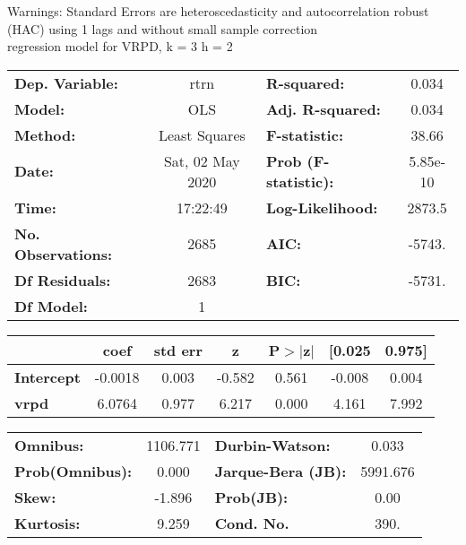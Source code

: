 Warnings: \newline
 [1] Standard Errors are heteroscedasticity and autocorrelation robust (HAC) using 1 lags and without small sample correction\\ 

regression model for VRPD, k = 3 h = 2\begin{center}
\begin{tabular}{lclc}
\toprule
\textbf{Dep. Variable:}    &       rtrn       & \textbf{  R-squared:         } &     0.034   \\
\textbf{Model:}            &       OLS        & \textbf{  Adj. R-squared:    } &     0.034   \\
\textbf{Method:}           &  Least Squares   & \textbf{  F-statistic:       } &     38.66   \\
\textbf{Date:}             & Sat, 02 May 2020 & \textbf{  Prob (F-statistic):} &  5.85e-10   \\
\textbf{Time:}             &     17:22:49     & \textbf{  Log-Likelihood:    } &    2873.5   \\
\textbf{No. Observations:} &        2685      & \textbf{  AIC:               } &    -5743.   \\
\textbf{Df Residuals:}     &        2683      & \textbf{  BIC:               } &    -5731.   \\
\textbf{Df Model:}         &           1      & \textbf{                     } &             \\
\bottomrule
\end{tabular}
\begin{tabular}{lcccccc}
                   & \textbf{coef} & \textbf{std err} & \textbf{z} & \textbf{P$> |$z$|$} & \textbf{[0.025} & \textbf{0.975]}  \\
\midrule
\textbf{Intercept} &      -0.0018  &        0.003     &    -0.582  &         0.561        &       -0.008    &        0.004     \\
\textbf{vrpd}      &       6.0764  &        0.977     &     6.217  &         0.000        &        4.161    &        7.992     \\
\bottomrule
\end{tabular}
\begin{tabular}{lclc}
\textbf{Omnibus:}       & 1106.771 & \textbf{  Durbin-Watson:     } &    0.033  \\
\textbf{Prob(Omnibus):} &   0.000  & \textbf{  Jarque-Bera (JB):  } & 5991.676  \\
\textbf{Skew:}          &  -1.896  & \textbf{  Prob(JB):          } &     0.00  \\
\textbf{Kurtosis:}      &   9.259  & \textbf{  Cond. No.          } &     390.  \\
\bottomrule
\end{tabular}
\end{center}

